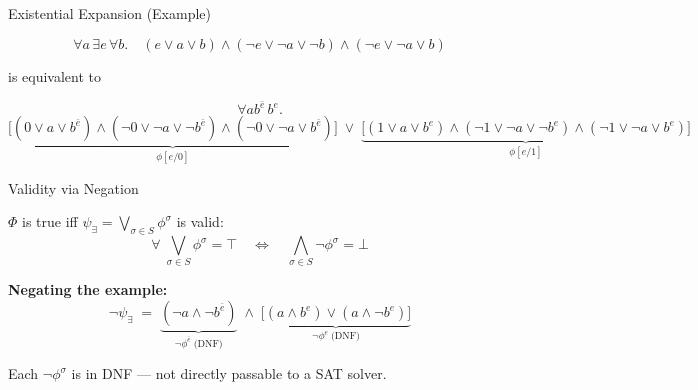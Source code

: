 \documentclass[utf8,aspectratio=169,ngerman,english]{beamer}
\begin{document}
    \begin{frame}{Existential Expansion (Example)}
    \footnotesize
    
    \[
        \forall a\, \exists e\, \forall b.\quad
        (e \vee a \vee b) \wedge (\neg e \vee \neg a \vee \neg b) \wedge (\neg e \vee \neg a \vee b)
    \]
    
    is equivalent to
    
    \[
        \forall a b^{\bar e}\, b^{e}.
    \]
    \[
        \underbrace{\bigl[(0 \vee a \vee b^{\bar e}) \wedge (\neg 0 \vee \neg a \vee \neg b^{\bar e}) \wedge (\neg 0 \vee \neg a \vee b^{\bar e})\bigr]}_{\phi[e/0]}
        \;\vee\;
        \underbrace{\bigl[(1 \vee a \vee b^{e}) \wedge (\neg 1 \vee \neg a \vee \neg b^{e}) \wedge (\neg 1 \vee \neg a \vee b^{e})\bigr]}_{\phi[e/1]}
    \]
    
    \end{frame}
    
    
    \begin{frame}{Validity via Negation}
    \footnotesize
    
    $\Phi$ is true iff $\psi_\exists = \bigvee_{\sigma\in S} \phi^\sigma$ is valid:
    \[
        \forall\; \bigvee_{\sigma \in S}\phi^\sigma = \top
        \quad\Longleftrightarrow\quad
        \bigwedge_{\sigma \in S}\neg\phi^\sigma = \bot
    \]
    
    \medskip
    \textbf{Negating the example:}
    \[
        \neg\psi_\exists \;=\;
        \underbrace{(\neg a \wedge \neg b^{\bar e})}_{\neg\phi^{\bar e}\;\text{(DNF)}}
        \;\wedge\;
        \underbrace{\bigl[(a \wedge b^{e}) \vee (a \wedge \neg b^{e})\bigr]}_{\neg\phi^{e}\;\text{(DNF)}}
    \]
    
    Each $\neg\phi^\sigma$ is in DNF --- not directly passable to a SAT solver.
    \end{frame}
    
    
    
    
    
    
    
    
    
    
    
\end{document}
